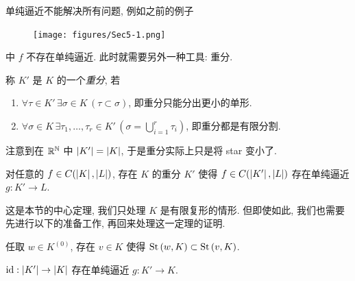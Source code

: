 单纯逼近不能解决所有问题, 例如之前的例子
\begin{figure}[htbp]
	\centering
	\texttt{[image: figures/Sec5-1.png]}
\end{figure}
中 $ f $ 不存在单纯逼近. 此时就需要另外一种工具: 重分.

\begin{Definition}[重分]
	称 $ K' $ 是 $ K $ 的一个\emph{重分}, 若
	\begin{enumerate}[(1)]
		\item $ \forall\tau\in K'\,\exists\sigma\in K\,(\tau\subset\sigma) $, 即重分只能分出更小的单形.
		\item $ \forall\sigma\in K\,\exists\tau_1,\dots,\tau_r\in K'\,(\sigma=\bigcup_{i=1}^r\tau_i) $, 即重分都是有限分割.
	\end{enumerate}
	注意到在 $ \mathbb{R}^{\mathbb{N}} $ 中 $ \left| K' \right| =\left| K \right|  $, 于是重分实际上只是将 star 变小了.
\end{Definition}

\begin{Theorem}[单纯逼近定理]\label{thm:单纯逼近定理}
	对任意的 $ f\in C(\left| K \right| ,\left| L \right| ) $, 存在 $ K $ 的重分 $ K' $ 使得 $ f\in C(\left| K' \right| ,\left| L \right| ) $ 存在单纯逼近 $ g : K'\to L $.
\end{Theorem}

这是本节的中心定理, 我们只处理 $ K $ 是有限复形的情形. 但即使如此, 我们也需要先进行以下的准备工作, 再回来处理这一定理的证明.

\begin{Lemma}
	任取 $ w\in K^{(0)} $, 存在 $ v\in K $ 使得 $ \mathrm{St}\,(w,K)\subset\mathrm{St}\,(v,K) $.
\end{Lemma}

\begin{Proposition}
	$ \mathrm{id} : \left| K' \right| \to\left| K \right|  $ 存在单纯逼近 $ g : K'\to K $.
\end{Proposition}

